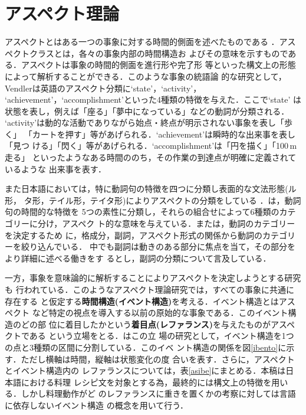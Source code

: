 \section{アスペクト理論}

アスペクトとはある一つの事象に対する時間的側面を述べたものである
\cite{kudo,tojo11,tojo2}．アスペクトクラスとは，各々の事象内部の時間構造お
よびその意味を示すものである．アスペクトは事象の時間的側面を進行形や完了形
等といった構文上の形態によって解析することができる．このような事象の統語論
的な研究として，Vendlerは英語のアスペクト分類に`state'，`activity'，
`achievement'，`accomplishment'といった4種類の特徴を与えた．ここで`state'
は状態を表し，例えば「座る」「夢中になっている」などの動詞が分類される．
`activity'は動的な活動でありながら始点・終点が明示されない事象を表し「歩く」
「カートを押す」等があげられる．`achievement'は瞬時的な出来事を表し「見つ
ける」「閃く」等があげられる．`accomplishment'は「円を描く」「100\,m 走る」
といったようなある時間ののち，その作業の到達点が明確に定義されているような
出来事を表す\cite{vendler1,vendler2}．

また日本語においては，特に動詞句の特徴を四つに分類し表面的な文法形態(ル形，
タ形，テイル形，テイタ形)によりアスペクトの分類をしている
\cite{kindaiti,kusanagi,matida}．\cite{moriyama}は，動詞句の時間的な特徴を
5つの素性に分類し，それらの組合せによって6種類のカテゴリーに分け，アスペク
ト的な意味を与えている．また\cite{ooisi}は，動詞のカテゴリーを決定するため
に，格成分，副詞，アスペクト形式の関係から動詞のカテゴリーを絞り込んでいる．
中でも副詞は動きのある部分に焦点を当て，その部分をより詳細に述べる働きをす
るとし，副詞の分類について言及している．

一方，事象を意味論的に解析することによりアスペクトを決定しようとする研究も
行われている．このようなアスペクト理論研究では，すべての事象に共通に存在する
と仮定する{\bf 時間構造(イベント構造)}を考える．イベント構造とはアスペクト
など特定の視点を導入する以前の原始的な事象である．このイベント構造のどの部
位に着目したかという{\bf 着目点(レファランス)}を与えたものがアスペクトである
という立場をとる\cite{kamp,moens,tojo1,tojo11,tojo2}．\cite{tojo2}はこの立
場の研究として，イベント構造を1つの点と3種類の区間に分割している．このイベ
ント構造の関係を図\ref{ibento}に示す．ただし横軸は時間，縦軸は状態変化の度
合いを表す．さらに，アスペクトとイベント構造内の
レファランスについては，表\ref{asibe}にまとめる．本稿は日本語における料理
レシピ文を対象とする為，最終的には構文上の特徴を用いる．しかし料理動作がど
のレファランスに重きを置くかの考察に対しては言語に依存しないイベント構造
の概念を用いて行う．


